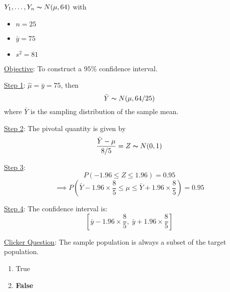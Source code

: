 \begin{exbox}
    \begin{example}
        $ Y_1,\ldots ,Y_n \thicksim N(\mu,64) $ with
        \begin{itemize}
            \item $ n=25 $
            \item $ \bar{y}=75 $
            \item $ s^2=81 $
        \end{itemize}
        \underline{Objective}: To construct a $ 95\% $ confidence interval.
        
        \underline{Step 1}: $ \hat{\mu}=\bar{y}=75 $, then
        \[ \bar{Y} \thicksim N(\mu,64/25) \]
        where $ \bar{Y} $ is the sampling distribution of the sample mean.
        
        \underline{Step 2}: The pivotal quantity is given by
        \[ \frac{\bar{Y}-\mu}{8/5} =Z \thicksim N(0,1) \]
        
        \underline{Step 3}:
        \[ P\left(-1.96\leqslant Z\leqslant 1.96\right)=0.95 \]
        \[ \implies P\left( \bar{Y}-1.96\times \frac{8}{5} \leqslant \mu
            \leqslant \bar{Y}+1.96\times \frac{8}{5} \right)=0.95 \]
        
        \underline{Step 4}: The confidence interval is:
        \[ \left[ \bar{y}-1.96\times \frac{8}{5},\;\bar{y}+1.96\times \frac{8}{5} \right] \]
    \end{example}
\end{exbox}

\underline{Clicker Question}: The sample population is always a subset of the target
population.
\begin{enumerate}[label=(\alph*)]
    \item True
    \item \textbf{False}
\end{enumerate}
